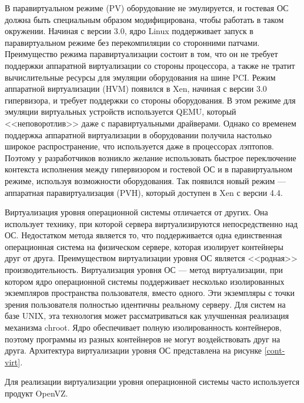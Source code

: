 В паравиртуальном режиме (PV) оборудование не эмулируется, и гостевая ОС должна быть специальным образом модифицирована, чтобы работать в таком окружении.
Начиная с версии 3.0, ядро Linux поддерживает запуск в паравиртуальном режиме без перекомпиляции со сторонними патчами.
Преимущество режима паравиртуализации состоит в том, что он не требует поддержки аппаратной виртуализации со стороны процессора, а также не тратит вычислительные ресурсы для эмуляции оборудования на шине PCI.
Режим аппаратной виртуализации (HVM) появился в Xen, начиная с версии 3.0 гипервизора, и требует поддержки со стороны оборудования.
В этом режиме для эмуляции виртуальных устройств используется QEMU, который <<неповоротлив>> даже с паравиртуальными драйверами.
Однако со временем поддержка аппаратной виртуализации в оборудовании получила настолько широкое распространение, что используется даже в процессорах лэптопов.
Поэтому у разработчиков возникло желание использовать быстрое переключение контекста исполнения между гипервизором и гостевой ОС и в паравиртуальном режиме, используя возможности оборудования.
Так появился новый режим --- аппаратная паравиртуализация (PVH), который доступен в Xen с версии 4.4.

Виртуализация уровня операционной системы отличается от других.
Она использует технику, при которой сервера виртуализируются непосредственно над ОС.
Недостатком метода является то, что поддерживается одна единственная операционная система на физическом сервере, которая изолирует контейнеры друг от друга.
Преимуществом виртуализации уровня ОС является <<родная>> производительность.
Виртуализация уровня ОС --- метод виртуализации, при котором ядро операционной системы поддерживает несколько изолированных экземпляров пространства пользователя, вместо одного.
Эти экземпляры с точки зрения пользователя полностью идентичны реальному серверу.
Для систем на базе UNIX, эта технология может рассматриваться как улучшенная реализация механизма chroot.
Ядро обеспечивает полную изолированность контейнеров, поэтому программы из разных контейнеров не могут воздействовать друг на друга.
Архитектура виртуализации уровня ОС представлена на рисунке \ref{cont-virt}.

Для реализации виртуализации уровня операционной системы часто используется продукт OpenVZ.


